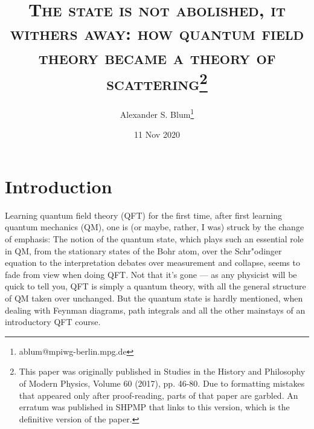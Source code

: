 \documentclass[12pt]{article}
\begin{document}
\date{11 Nov 2020}
\title{\textsc{{The state is not abolished, it withers away: how quantum field theory became a theory of scattering\footnote{This paper was originally published in Studies in the History and Philosophy of Modern Physics, Volume 60 (2017), pp. 46-80. Due to formatting mistakes that appeared only after proof-reading, parts of that paper are garbled. An erratum was published in SHPMP that links to this version, which is the definitive version of the paper.} }}}
\author{Alexander S. Blum\thanks{ablum@mpiwg-berlin.mpg.de}}
\maketitle
\thispagestyle{empty}

\newpage
\section{Introduction}
Learning quantum field theory (QFT) for the first time, after first learning quantum mechanics (QM), one is (or maybe, rather, I was) struck by the change of emphasis: The notion of the quantum state, which plays such an essential role in QM, from the stationary states of the Bohr atom, over the Schr"odinger equation to the interpretation debates over measurement and collapse, seems to fade from view when doing QFT. Not that it's gone --- as any physicist will be quick to tell you, QFT is simply a quantum theory, with all the general structure of QM taken over unchanged. But the quantum state is hardly mentioned, when dealing with Feynman diagrams, path integrals and all the other mainstays of an introductory QFT course.
\end{document}
